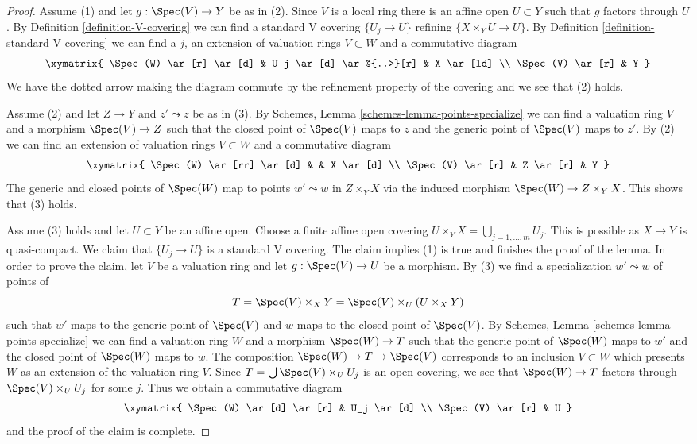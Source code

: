 \begin{proof}
Assume (1) and let $g : \Spec(V) \to Y$ be as in (2).
Since $V$ is a local ring there is an affine open $U \subset Y$
such that $g$ factors through $U$. By Definition \ref{definition-V-covering}
we can find a standard V covering $\{U_j \to U\}$ refining
$\{X \times_Y U \to U\}$. By Definition \ref{definition-standard-V-covering}
we can find a $j$, an extension of valuation rings $V \subset W$
and a commutative diagram
$$
\xymatrix{
\Spec(W) \ar[r] \ar[d] & U_j \ar[d] \ar@{..>}[r] & X \ar[ld] \\
\Spec(V) \ar[r] & Y
}
$$
We have the dotted arrow making the diagram commute by the refinement
property of the covering and we see that (2) holds.

\medskip\noindent
Assume (2) and let $Z \to Y$ and $z' \leadsto z$ be as in (3).
By Schemes, Lemma \ref{schemes-lemma-points-specialize}
we can find a valuation ring $V$ and a morphism $\Spec(V) \to Z$
such that the closed point of $\Spec(V)$ maps to $z$ and the
generic point of $\Spec(V)$ maps to $z'$. By (2) we can find an
extension of valuation rings $V \subset W$ and a
commutative diagram
$$
\xymatrix{
\Spec(W) \ar[rr] \ar[d] & & X \ar[d] \\
\Spec(V) \ar[r] & Z \ar[r] & Y
}
$$
The generic and closed points of $\Spec(W)$ map to points
$w' \leadsto w$ in $Z \times_Y X$ via the
induced morphism $\Spec(W) \to Z \times_Y X$.
This shows that (3) holds.

\medskip\noindent
Assume (3) holds and let $U \subset Y$ be an affine open.
Choose a finite affine open covering
$U \times_Y X = \bigcup_{j = 1, \ldots, m} U_j$.
This is possible as $X \to Y$ is quasi-compact.
We claim that $\{U_j \to U\}$ is a standard V covering.
The claim implies (1) is true and finishes the proof of the lemma.
In order to prove the claim, let $V$ be a valuation ring
and let $g : \Spec(V) \to U$ be a morphism.
By (3) we find a specialization $w' \leadsto w$ of
points of
$$
T = \Spec(V) \times_X Y = \Spec(V) \times_U (U \times_X Y)
$$
such that $w'$ maps to the generic point of $\Spec(V)$
and $w$ maps to the closed point of $\Spec(V)$.
By Schemes, Lemma \ref{schemes-lemma-points-specialize}
we can find a valuation ring $W$ and a morphism
$\Spec(W) \to T$ such that the generic point of $\Spec(W)$
maps to $w'$ and the closed point of $\Spec(W)$ maps to $w$.
The composition $\Spec(W) \to T \to \Spec(V)$ corresponds
to an inclusion $V \subset W$ which presents $W$ as an
extension of the valuation ring $V$.
Since $T = \bigcup \Spec(V) \times_U U_j$ is an open
covering, we see that $\Spec(W) \to T$ factors through
$\Spec(V) \times_U U_j$ for some $j$. Thus we obtain
a commutative diagram
$$
\xymatrix{
\Spec(W) \ar[d] \ar[r] & U_j \ar[d] \\
\Spec(V) \ar[r] & U
}
$$
and the proof of the claim is complete.
\end{proof}

